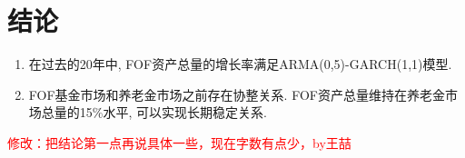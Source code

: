 \section{结论}
    \begin{enumerate}
        \item 在过去的20年中, FOF资产总量的增长率满足ARMA(0,5)-GARCH(1,1)模型.
        \item FOF基金市场和养老金市场之前存在协整关系. FOF资产总量维持在养老金市场总量的15\%水平, 可以实现长期稳定关系.
    \end{enumerate}

\textcolor{red}{修改：把结论第一点再说具体一些，现在字数有点少，by王喆}
\clearpage
